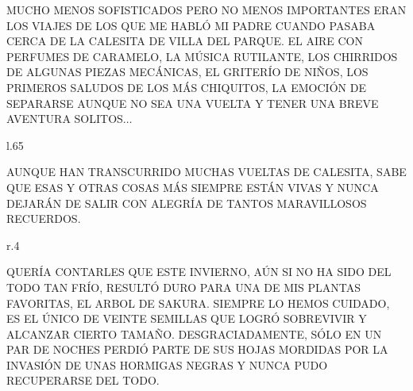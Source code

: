 MUCHO MENOS SOFISTICADOS PERO NO MENOS IMPORTANTES ERAN LOS VIAJES DE LOS QUE ME HABLÓ MI PADRE CUANDO PASABA CERCA DE LA CALESITA DE VILLA DEL PARQUE. EL AIRE CON PERFUMES DE CARAMELO, LA MÚSICA RUTILANTE, LOS CHIRRIDOS DE ALGUNAS PIEZAS MECÁNICAS, EL GRITERÍO DE NIÑOS, LOS PRIMEROS SALUDOS DE LOS MÁS CHIQUITOS, LA EMOCIÓN DE SEPARARSE AUNQUE NO SEA UNA VUELTA Y TENER UNA BREVE AVENTURA SOLITOS$\ldots$ 

\newpage
{}
\begin{wrapfigure} [15]{l}{.65\textwidth}\vspace{-3.2cm}%
\end{wrapfigure}
AUNQUE HAN TRANSCURRIDO MUCHAS VUELTAS DE CALESITA, SABE QUE 
ESAS Y OTRAS COSAS MÁS SIEMPRE ESTÁN VIVAS Y NUNCA DEJARÁN DE SALIR CON ALEGRÍA DE TANTOS MARAVILLOSOS RECUERDOS. 

\newpage
{}
\begin{wrapfigure}[12]{r}{.4\textwidth}\vspace{-1.2cm}
\end{wrapfigure}
QUERÍA CONTARLES QUE ESTE INVIERNO, AÚN SI NO HA SIDO DEL TODO TAN FRÍO, RESULTÓ DURO PARA UNA DE MIS PLANTAS FAVORITAS, EL ARBOL DE SAKURA. SIEMPRE LO HEMOS CUIDADO, ES EL ÚNICO DE VEINTE SEMILLAS QUE LOGRÓ SOBREVIVIR Y ALCANZAR CIERTO TAMAÑO. DESGRACIADAMENTE, SÓLO  EN UN PAR DE NOCHES PERDIÓ PARTE DE SUS HOJAS MORDIDAS POR LA INVASIÓN DE UNAS HORMIGAS NEGRAS Y NUNCA PUDO RECUPERARSE DEL TODO.

